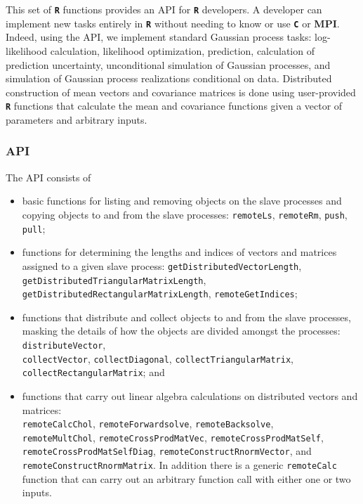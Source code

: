\documentclass[12pt]{article}
\newcommand{\proglang}[1]{\textbf{\texttt{#1}}}
\newcommand{\pkg}[1]{\textbf{#1}}
\newcommand{\code}[1]{\texttt{#1}}
\begin{document}
This set of \proglang{R} functions provides an API for \proglang{R} developers. A developer can implement new tasks entirely in \proglang{R} without needing to know or use \proglang{C} or \pkg{MPI}. Indeed, using the API, we implement standard Gaussian process tasks: log-likelihood calculation, likelihood optimization, prediction, calculation of prediction uncertainty, unconditional simulation of Gaussian processes, and simulation of Gaussian process realizations conditional on data. Distributed construction of mean vectors and covariance matrices is done using user-provided \proglang{R} functions that calculate the mean and covariance functions given a vector of parameters and arbitrary inputs. 

\subsubsection{API}

The API consists of 
\begin{itemize}
\item basic functions for listing and removing objects on the slave processes and copying objects to and from the slave processes: \code{remoteLs}, \code{remoteRm}, \code{push}, \code{pull};
\item functions for determining the lengths and indices of vectors and matrices assigned to a given slave process: \code{getDistributedVectorLength},\\\code{getDistributedTriangularMatrixLength},\\\code{getDistributedRectangularMatrixLength}, \code{remoteGetIndices};
\item functions that distribute and collect objects to and from the slave processes, masking the details of how the objects are divided amongst the processes: \code{distributeVector}, \\\code{collectVector}, \code{collectDiagonal}, \code{collectTriangularMatrix},\\\code{collectRectangularMatrix}; and
\item functions that carry out linear algebra calculations on distributed vectors and matrices: \\\code{remoteCalcChol}, \code{remoteForwardsolve}, \code{remoteBacksolve}, \\\code{remoteMultChol}, \code{remoteCrossProdMatVec}, \code{remoteCrossProdMatSelf}, \\\code{remoteCrossProdMatSelfDiag}, \code{remoteConstructRnormVector}, and \code{remoteConstructRnormMatrix}. In addition there is a generic \code{remoteCalc} function that can carry out an arbitrary function call with either one or two inputs. 
\end{itemize}
\end{document}
